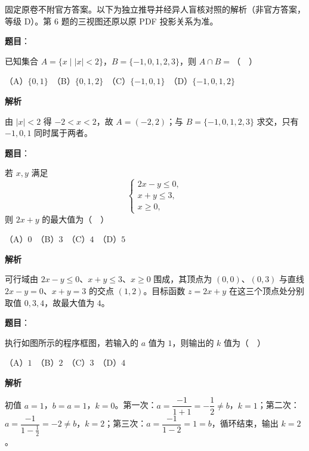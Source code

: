 

\begin{gktip}
固定原卷不附官方答案。以下为独立推导并经异人盲核对照的解析（非官方答案，等级 D）。第 6 题的三视图还原以原 PDF 投影关系为准。
\end{gktip}

\begin{answer}

\textbf{题目}：

已知集合 \(A=\{x\mid |x|<2\}\)，\(B=\{-1,0,1,2,3\}\)，则 \(A\cap B=\)（　）

（A）\(\{0,1\}\)　（B）\(\{0,1,2\}\)　（C）\(\{-1,0,1\}\)　（D）\(\{-1,0,1,2\}\)

\textbf{解析}

由 \(|x|<2\) 得 \(-2<x<2\)，故 \(A=(-2,2)\)；与 \(B=\{-1,0,1,2,3\}\) 求交，只有 \(-1,0,1\) 同时属于两者。


\end{answer}
\begin{answer}

\textbf{题目}：

若 \(x,y\) 满足
\nopagebreak[4]
\[
\begin{cases}
2x-y\leqslant 0,\\
x+y\leqslant 3,\\
x\geqslant 0,
\end{cases}
\]
则 \(2x+y\) 的最大值为（　）

（A）\(0\)　（B）\(3\)　（C）\(4\)　（D）\(5\)

\textbf{解析}

可行域由 \(2x-y\leqslant0\)、\(x+y\leqslant3\)、\(x\geqslant0\) 围成，其顶点为 \((0,0)\)、\((0,3)\) 与直线 \(2x-y=0\)、\(x+y=3\) 的交点 \((1,2)\)。目标函数 \(z=2x+y\) 在这三个顶点处分别取值 \(0,3,4\)，故最大值为 \(4\)。


\end{answer}
\begin{answer}

\textbf{题目}：

执行如图所示的程序框图，若输入的 \(a\) 值为 \(1\)，则输出的 \(k\) 值为（　）
\nopagebreak[4]
\begin{center}\end{center}
\nopagebreak[4]
（A）\(1\)　（B）\(2\)　（C）\(3\)　（D）\(4\)

\textbf{解析}

初值 \(a=1\)，\(b=a=1\)，\(k=0\)。第一次：\(a=\dfrac{-1}{1+1}=-\dfrac12\neq b\)，\(k=1\)；第二次：\(a=\dfrac{-1}{1-\frac12}=-2\neq b\)，\(k=2\)；第三次：\(a=\dfrac{-1}{1-2}=1=b\)，循环结束，输出 \(k=2\)。


\end{answer}
